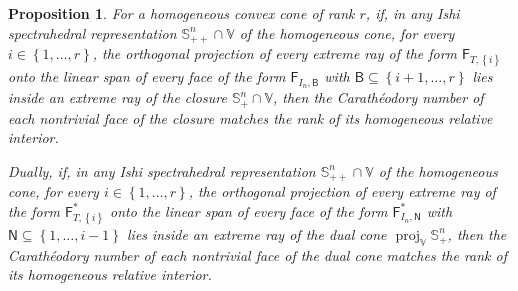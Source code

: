 \documentclass[oneside]{amsart}
\theoremstyle{plain}
\newtheorem{proposition}[theorem]{Proposition}
\theoremstyle{definition}
\theoremstyle{remark}
\numberwithin{equation}{section}
\DeclareMathOperator{\proj}{proj}
\begin{document}
\begin{proposition}\label{proposition:Caratheodorynumberssufficient}
For a homogeneous convex cone of rank $r$, if, in any Ishi spectrahedral
representation $\mathbb{S}^{n}_{++} \cap \mathbb{V}$ of the homogeneous
cone, for every $i \in \left\{1, \dotsc, r\right\}$, the orthogonal
projection of every extreme ray of the form
$\mathsf{F}_{T,\left\{i\right\}}$ onto the linear span of every face of the
form $\mathsf{F}_{I_{n},\mathsf{B}}$ with $\mathsf{B} \subseteq \left\{i+1,
\dotsc, r\right\}$ lies inside an extreme ray of the closure
$\mathbb{S}^{n}_{+} \cap \mathbb{V}$, then the Carath\'eodory number of
each nontrivial face of the closure matches the rank of its homogeneous
relative interior.

Dually, if, in any Ishi spectrahedral representation $\mathbb{S}^{n}_{++}
\cap \mathbb{V}$ of the homogeneous cone, for every $i \in \left\{1,
\dotsc, r\right\}$, the orthogonal projection of every extreme ray of the
form $\mathsf{F}^{*}_{T,\left\{i\right\}}$ onto the linear span of every
face of the form $\mathsf{F}^{*}_{I_{n},\mathsf{N}}$ with $\mathsf{N}
\subseteq \left\{1, \dotsc, i-1\right\}$ lies inside an extreme ray of the
dual cone $\proj_{\mathbb{V}} \mathbb{S}^{n}_{+}$, then the Carath\'eodory
number of each nontrivial face of the dual cone matches the rank of its
homogeneous relative interior.
\end{proposition}
\end{document}
